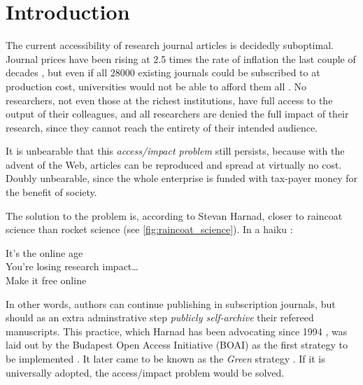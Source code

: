\documentclass[11pt, openany, oneside, article, a4paper, twocolumn]{memoir}
\begin{document}
\section{Introduction}

The current accessibility of research journal articles is decidedly
suboptimal. Journal prices have been rising at 2.5 times the rate of
inflation the last couple of decades \cite{monograph_serial_costs,
suber2008open}, but even if all 28000 existing journals could be
subscribed to at production cost, universities would not be able to afford
them all \cite{harnad2008access}. No researchers, not even those at the
richest institutions, have full access to the output of their colleagues,
and all researchers are denied the full impact of their research, since
they cannot reach the entirety of their intended audience.

It is unbearable that this \emph{access/impact problem} still persists,
because with the advent of the Web, articles can be reproduced and spread
at virtually no cost. Doubly unbearable, since the whole enterprise is
funded with tax-payer money for the benefit of society. 

The solution to the problem is, according to Stevan Harnad, closer to
raincoat science than rocket science (see \autoref{fig:raincoat_science}). In a haiku \cite{harnad_raincoat}:
\begin{displayquote}
\begin{small}
It's the online age\\
You're losing research impact\dots \\
Make it free online
\end{small}
\end{displayquote}
In other words, authors can continue publishing in subscription journals,
but should as an extra adminstrative step \emph{publicly self-archive}
their refereed manuscripts. This practice, which Harnad has been
advocating since 1994 \cite{harnad1995subversive}, was laid out by the
Budapest Open Access Initiative (BOAI) as the first strategy to be
implemented \cite{boai}. It later came to be known as the \emph{Green}
strategy \cite{harnad2004access}. If it is universally adopted, the
access/impact problem would be solved.
\end{document}
